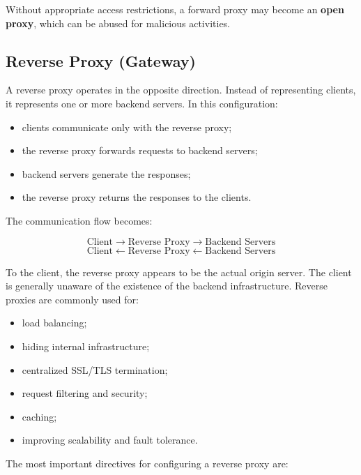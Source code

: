 \documentclass{scrbook}
\begin{document}
	Without appropriate access restrictions, a forward proxy may become an \textbf{open proxy}, which can be abused for malicious activities.
	
	\subsection{Reverse Proxy (Gateway)}
	
	A reverse proxy operates in the opposite direction. Instead of representing clients, it represents one or more backend servers. In this configuration:
	\begin{itemize}
		\item clients communicate only with the reverse proxy;
		
		\item the reverse proxy forwards requests to backend servers;
		
		\item backend servers generate the responses;
		
		\item the reverse proxy returns the responses to the clients.
	\end{itemize}
	
	The communication flow becomes:
	
	\[
	\text{Client} \rightarrow \text{Reverse Proxy} \rightarrow \text{Backend Servers}
	\]
	\[
	\text{Client} \leftarrow \text{Reverse Proxy} \leftarrow \text{Backend Servers}
	\]
	
	To the client, the reverse proxy appears to be the actual origin server. The client is generally unaware of the existence of the backend infrastructure. Reverse proxies are commonly used for:
	\begin{itemize}
		\item load balancing;
		
		\item hiding internal infrastructure;
		
		\item centralized SSL/TLS termination;
		
		\item request filtering and security;
		
		\item caching;
		
		\item improving scalability and fault tolerance.
	\end{itemize}
	
	The most important directives for configuring a reverse proxy are:
	
\end{document}
